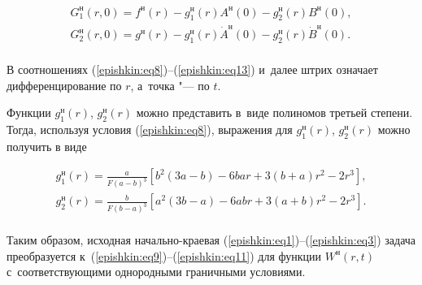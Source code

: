\begin{equation}

\label{epishkin:eq13}

\begin{array}{c}

\displaystyle

 G_1^{\text{н}} (r,0)=f^{\text{н}}(r)-g_1^{\text{н}} (r)  A^{\text{н}}(0)-g_2^{\text{н}} (r)  B^{\text{н}}(0), \\ 

\displaystyle

 G_2^{\text{н}} (r,0)=g^{\text{н}} (r)-g_1^{\text{н}} (r)  \dot A^{\text{н}}(0)-g_2^{\text{н}} (r)  \dot B^{\text{н}}(0). \\ 

 \end{array}

\end{equation}

В соотношениях (\ref{epishkin:eq8})--(\ref{epishkin:eq13}) и~далее штрих означает дифференцирование по $r$, а~точка "--- по $t$.



Функции $g_1^{\text{н}} (r)$, $g_2^{\text{н}} (r)$ можно представить в~виде полиномов третьей степени. Тогда, используя условия (\ref{epishkin:eq8}), выражения для $g_1^{\text{н}} (r)$, $g_2^{\text{н}} (r)$ можно  получить в виде

\begin{equation}

\label{epishkin:eq14}

\begin{array}{l}

 g_1^{\text{н}} (r)=\frac{a}{F(a-b)^3}  \left[ {b^2(3  a-b)-6  b  

a  r+3  (b+a)  r^2-2  r^3} \right], \\ 

 g_2^{\text{н}} (r)=\frac{b}{F(b-a)^3}  \left[ {a^2(3  b-a)-6  a  

b  r+3  (a+b)  r^2-2  r^3} \right]. \\ 

 \end{array}

\end{equation}



Таким образом, исходная начально-краевая (\ref{epishkin:eq1})--(\ref{epishkin:eq3}) задача преобразуется к~(\ref{epishkin:eq9})--(\ref{epishkin:eq11}) для функции $W^{\text{н}}(r,t)$ с~соответствующими однородными граничными условиями. 


